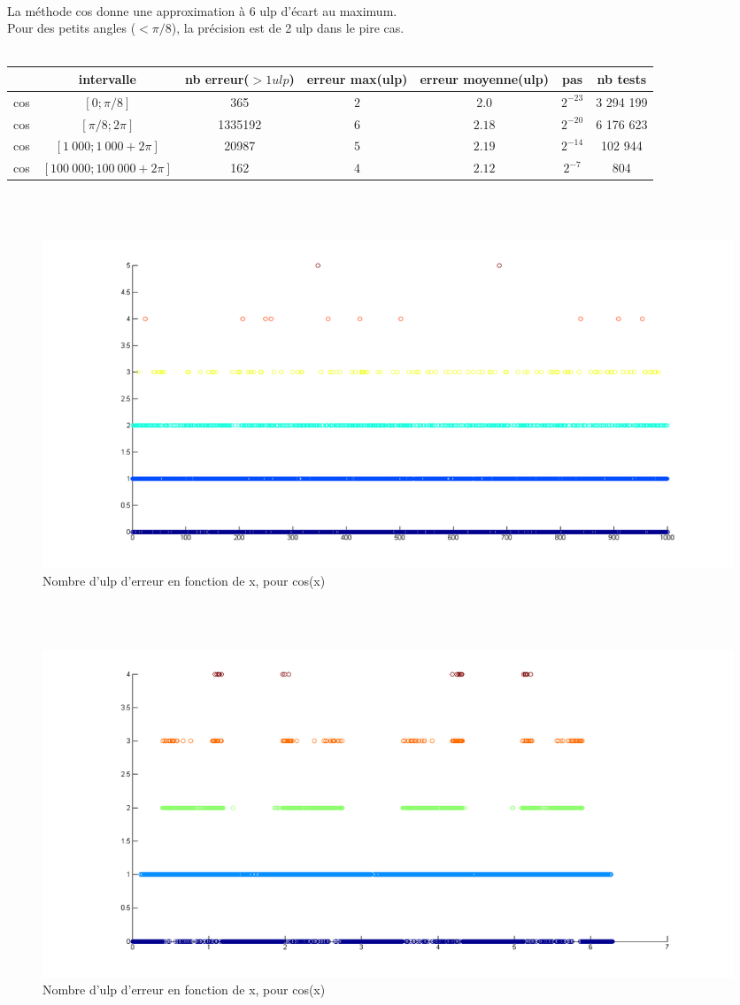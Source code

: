 \documentclass[a4,12pt]{article}
\begin{document}
\\
\clearpage
La méthode cos donne une approximation à 6 ulp d'écart au maximum.\\
Pour des petits angles ($<\pi /8$), la précision est de 2 ulp dans le pire cas.\\
\\

\hspace{-4cm}\begin{tabular}{|c|c|c|c|c|c|c|}

\hline 
 & intervalle & nb erreur($>1 ulp$) & erreur max(ulp)& erreur moyenne(ulp) & pas & nb tests \\
\hline 
cos & $[0; \pi /8]$             & 365      & $2$ & 2.0        &$2^{-23}$ & 3 294 199\\
\hline 
cos & $[\pi /8; 2\pi]$          & 1335192 & $6$ &$2.18$ & $2^{-20}$ & 6 176 623\\
\hline 
cos & $[1\ 000; 1\ 000 + 2\pi]$     & 20987    & $5$ &$2.19$ & $2^{-14}$ & 102 944\\
\hline 
cos & $[100\ 000; 100\ 000 + 2\pi]$ & 162     & $4$ &$ 2.12$ & $2^{-7}$ & 804\\
\hline
\end{tabular}
\\
\\
\begin{figure}[h!]
    \centering
    \hspace{-5cm}
    \includegraphics[scale=0.5]{cos1000}
    \caption{Nombre d'ulp d'erreur en fonction de x, pour cos(x)}
    \label{fig:my_label}
\end{figure}

\\
\\
\begin{figure}[h!]
    \centering
    \hspace{-5cm}
    \includegraphics[scale=0.5]{cos2PI}
    \caption{Nombre d'ulp d'erreur en fonction de x, pour cos(x)}
    \label{fig:my_label}
\end{figure}
\end{document}
